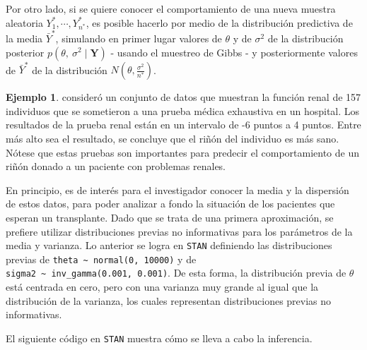 \documentclass[
  10pt,
  spanish,
]{book}
\theoremstyle{definition}
\theoremstyle{definition}
\newtheorem{example}{Ejemplo}[chapter]
\theoremstyle{definition}
\theoremstyle{definition}
\theoremstyle{remark}
\begin{document}
Por otro lado, si se quiere conocer el comportamiento de una nueva muestra aleatoria \(Y_1^{*},\cdots,Y_{n^*}^{*}\), es posible hacerlo por medio de la distribución predictiva de la media \(\bar{Y}^*\), simulando en primer lugar valores de \(\theta\) y de \(\sigma^2\) de la distribución posterior \(p(\theta,\ \sigma^2\mid\mathbf{Y})\) - usando el muestreo de Gibbs - y posteriormente valores de \(\bar{Y}^*\) de la distribución \(N(\theta,\frac{\sigma^2}{n^*})\).

\begin{example}
\protect\hypertarget{exm:EjeRenal}{}{\label{exm:EjeRenal} }\citet{Efronims} consideró un conjunto de datos que muestran la función renal de 157 individuos que se sometieron a una prueba médica exhaustiva en un hospital. Los resultados de la prueba renal están en un intervalo de -6 puntos a 4 puntos. Entre más alto sea el resultado, se concluye que el riñón del individuo es más sano. Nótese que estas pruebas son importantes para predecir el comportamiento de un riñón donado a un paciente con problemas renales.

En principio, es de interés para el investigador conocer la media y la dispersión de estos datos, para poder analizar a fondo la situación de los pacientes que esperan un transplante. Dado que se trata de una primera aproximación, se prefiere utilizar distribuciones previas no informativas para los parámetros de la media y varianza. Lo anterior se logra en \texttt{STAN} definiendo las distribuciones previas de \texttt{theta\ \textasciitilde{}\ normal(0,\ 10000)} y de \texttt{sigma2\ \textasciitilde{}\ inv\_gamma(0.001,\ 0.001)}. De esta forma, la distribución previa de \(\theta\) está centrada en cero, pero con una varianza muy grande al igual que la distribución de la varianza, los cuales representan distribuciones previas no informativas.

El siguiente código en \texttt{STAN} muestra cómo se lleva a cabo la inferencia.
\end{example}
\end{document}
